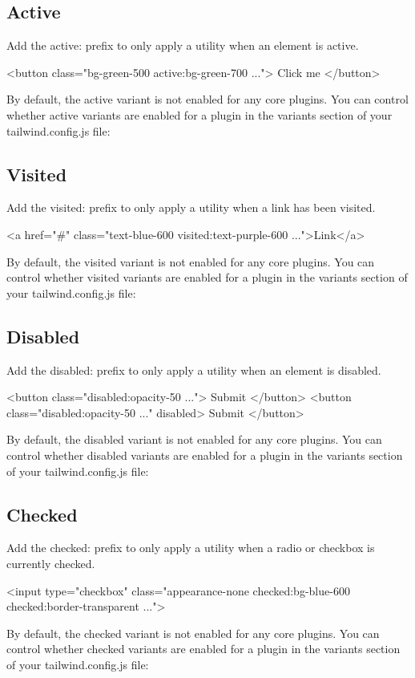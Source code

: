 \documentclass{report}
\begin{document}
    \subsection{Active}
    Add the active: prefix to only apply a utility when an element is active.
    \bigbreak \noindent 
    \begin{htmlcode}
        <button class="bg-green-500 active:bg-green-700 ...">
            Click me
        </button>
    \end{htmlcode}
    \bigbreak \noindent 
    By default, the active variant is not enabled for any core plugins.
    \bigbreak \noindent 
    You can control whether active variants are enabled for a plugin in the variants section of your tailwind.config.js file:
    \bigbreak \noindent 
    \subsection{Visited}
    \bigbreak \noindent 
    Add the visited: prefix to only apply a utility when a link has been visited.
    \bigbreak \noindent 
    \begin{htmlcode}
    <a href="#" class="text-blue-600 visited:text-purple-600 ...">Link</a>
    \end{htmlcode}
    \bigbreak \noindent 
    By default, the visited variant is not enabled for any core plugins.
    \bigbreak \noindent 
    You can control whether visited variants are enabled for a plugin in the variants section of your tailwind.config.js file:
    \bigbreak \noindent 
    \subsection{Disabled}
    \bigbreak \noindent 
    Add the disabled: prefix to only apply a utility when an element is disabled.
    \bigbreak \noindent 
    \begin{htmlcode}
        <button class="disabled:opacity-50 ...">
            Submit
        </button>
        <button class="disabled:opacity-50 ..." disabled>
            Submit
        </button>
    \end{htmlcode}
    \bigbreak \noindent 
    By default, the disabled variant is not enabled for any core plugins.
    \bigbreak \noindent 
    You can control whether disabled variants are enabled for a plugin in the variants section of your tailwind.config.js file:
    \bigbreak \noindent 
    \subsection{Checked}
    \bigbreak \noindent 
    Add the checked: prefix to only apply a utility when a radio or checkbox is currently checked.
    \bigbreak \noindent 
    \begin{htmlcode}
        <input type="checkbox" class="appearance-none checked:bg-blue-600 checked:border-transparent ...">
    \end{htmlcode}
    \bigbreak \noindent 
    By default, the checked variant is not enabled for any core plugins.
    \bigbreak \noindent 
    You can control whether checked variants are enabled for a plugin in the variants section of your tailwind.config.js file:
\end{document}
